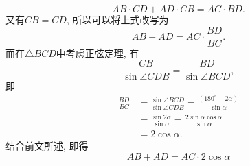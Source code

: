 \documentclass{book}
\begin{document}
\begin{paracol}{2}
\[AB\cdot CD+AD\cdot CB=AC\cdot BD.\]
又有$CB=CD$, 所以可以将上式改写为
\[AB+AD=AC\cdot\frac{BD}{BC}.\]
而在$\triangle BCD$中考虑正弦定理, 有
\[\frac{CB}{\sin{\angle CDB}}=\frac{BD}{\sin{\angle BCD}},\]
即
\begin{align*}
	\frac{BD}{BC}&=\frac{\sin{\angle BCD}}{\sin{\angle CDB}}=\frac{\left(180^\circ-2\alpha\right)}{\sin{\alpha}}\\
	&=\frac{\sin{2\alpha}}{\sin{\alpha}}=\frac{2\sin{\alpha}\cos{\alpha}}{\sin{\alpha}}\\
	&=2\cos{\alpha}.
\end{align*}
结合前文所述, 即得
\[AB+AD=AC\cdot 2\cos{\alpha}\]
\[\]




\end{paracol}
\end{document}
